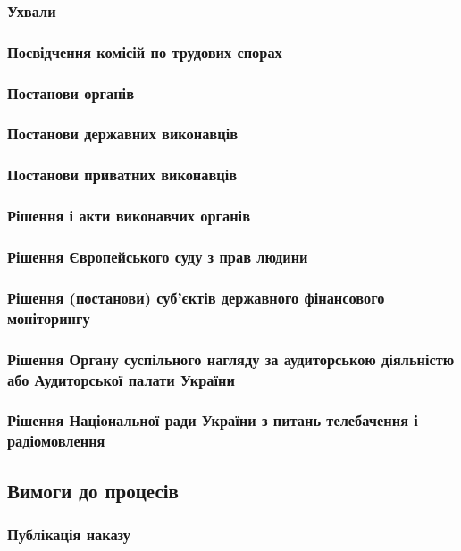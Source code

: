\documentclass{article}
\begin{document}
\subsubsection{Ухвали}
\subsubsection{Посвідчення комісій по трудових спорах}
\subsubsection{Постанови органів}
\subsubsection{Постанови державних виконавців}
\subsubsection{Постанови приватних виконавців}
\subsubsection{Рішення і акти виконавчих органів}
\subsubsection{Рішення Європейського суду з прав людини}
\subsubsection{Рішення (постанови) суб’єктів державного фінансового моніторингу}
\subsubsection{Рішення Органу суспільного нагляду за аудиторською діяльністю або Аудиторської палати України}
\subsubsection{Рішення Національної ради України з питань телебачення і радіомовлення}

\subsection{Вимоги до процесів}

\subsubsection{Публікація наказу}
\end{document}
